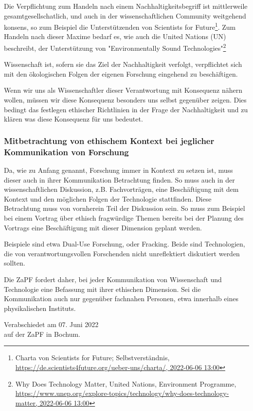 \documentclass[DIV=calc]{scrartcl}
\begin{document}
Die Verpflichtung zum Handeln nach einem Nachhaltigkeitsbegriff ist mittlerweile gesamtgesellschatlich, und auch in der wissenschaftlichen Community weitgehend konsens, so zum Beispiel die Unterstützenden von Scientists for Future\footnote{
Charta von Scientists for Future;
Selbstverständnis, \url{https://de.scientists4future.org/ueber-uns/charta/, 2022-06-06 13:00}}. Zum Handeln nach dieser Maxime bedarf es, wie auch die United Nations (UN) beschreibt, der Unterstützung von "Environmentally Sound Technologies"\footnote{Why Does Technology Matter, United Nations, Environment Programme, \url{https://www.unep.org/explore-topics/technology/why-does-technology-matter, 2022-06-06 13:00}}

Wissenschaft ist, sofern sie das Ziel der Nachhaltigkeit verfolgt, verpflichtet sich mit den ökologischen Folgen der eigenen Forschung eingehend zu beschäftigen. 

Wenn wir uns als Wissenschaftler dieser Verantwortung mit Konsequenz nähern wollen, müssen wir diese Konsequenz besonders uns selbst gegenüber zeigen. Dies bedingt das festlegen ethischer Richtlinien in der Frage der Nachhaltigkeit und zu klären was diese Konsequenz für uns bedeutet.

\subsubsection*{Mitbetrachtung von ethischem Kontext bei jeglicher Kommunikation von Forschung}

Da, wie zu Anfang genannt, Forschung immer in Kontext zu setzen ist, muss dieser auch in ihrer Kommunikation Betrachtung finden. So muss auch in der wissenschaftlichen Diskussion, z.B. Fachvorträgen, eine Beschäftigung mit dem Kontext und den möglichen Folgen der Technologie stattfinden. Diese Betrachtung muss von vornherein Teil der Diskussion sein. So muss zum Beispiel bei einem Vortrag über ethisch fragwürdige Themen bereits bei der Planung des Vortrags eine Beschäftigung mit dieser Dimension geplant werden.

Beispiele sind etwa Dual-Use Forschung, oder Fracking. Beide sind Technologien, die von verantwortungsvollen Forschenden nicht unreflektiert diskutiert werden sollten.

Die ZaPF fordert daher, bei jeder Kommunikation von Wissenschaft und Technologie eine Befassung mit ihrer ethischen Dimension. Sei die Kommunikation auch nur gegenüber fachnahen Personen, etwa innerhalb eines physikalischen Instituts.



\vspace{1cm} 

\vfill
\begin{flushright}
	Verabschiedet am 07. Juni 2022 \\
	auf der ZaPF in Bochum.
\end{flushright}
\end{document}

